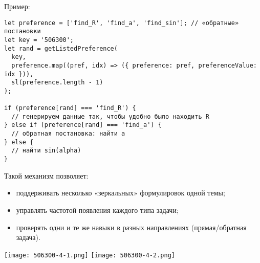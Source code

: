 Пример: 
\begin{lstlisting}
let preference = ['find_R', 'find_a', 'find_sin']; // «обратные» постановки
let key = '506300';
let rand = getListedPreference(
  key,
  preference.map((pref, idx) => ({ preference: pref, preferenceValue: idx })),
  sl(preference.length - 1)
);

if (preference[rand] === 'find_R') {
  // генерируем данные так, чтобы удобно было находить R
} else if (preference[rand] === 'find_a') {
  // обратная постановка: найти a
} else {
  // найти sin(alpha)
}
\end{lstlisting}

\noindent Такой механизм позволяет:
\begin{itemize}
  \item поддерживать несколько «зеркальных» формулировок одной темы;
  \item управлять частотой появления каждого типа задачи;
  \item проверять одни и те же навыки в разных направлениях (прямая/обратная задача).
\end{itemize}

 
\texttt{[image: 506300-4-1.png]}
\texttt{[image: 506300-4-2.png]}
